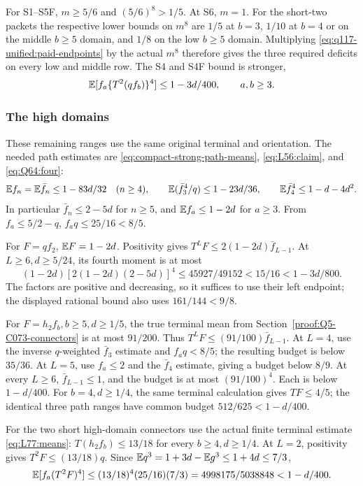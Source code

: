 For S1--S5F, \(m\ge5/6\) and \((5/6)^8>1/5\).
At S6, \(m=1\). For the short-two packets the respective
lower bounds on \(m^8\) are \(1/5\) at \(b=3\),
\(1/10\) at \(b=4\) or on the middle \(b\ge5\) domain,
and \(1/8\) on the low \(b\ge5\) domain.
Multiplying \eqref{eq:q117-unified:paid-endpoints} by the actual
\(m^8\) therefore gives the three required deficits on every
low and middle row. The S4 and S4F bound is stronger,
\begin{equation}\label{eq:q117-unified:shortone-two-step-strong}
 \mathbb E[f_a\{T^2(qf_b)\}^4]\le1-3d/400,
 \qquad a,b\ge3.
\end{equation}

\subsubsection{The high domains}
\label{sec:q117-unified:high-domains}

These remaining ranges use the same original terminal and
orientation. The needed path estimates are
\eqref{eq:compact-strong-path-means},
\eqref{eq:L56:claim}, and \eqref{eq:Q64:four}:
\[
 \mathbb E f_n=\mathbb E\bar f_n\le1-83d/32\quad(n\ge4),\qquad
 \mathbb E(\bar f_3^4/q)\le1-23d/36,\qquad
 \mathbb E\bar f_4^4\le1-d-4d^2.
\]
In particular \(\bar f_n\le2-5d\) for \(n\ge5\), and
\(\mathbb E f_a\le1-2d\) for \(a\ge3\).
From \(f_a\le5/2-q\),
\(f_aq\le25/16<8/5\).

For \(F=qf_2\), \(\mathbb E F=1-2d\). Positivity gives
\(T^LF\le2(1-2d)\bar f_{L-1}\).
At \(L\ge6,d\ge5/24\), its fourth moment is at most
\[
 (1-2d)[2(1-2d)(2-5d)]^4
 \le45927/49152<15/16<1-3d/800.
\]
The factors are positive and decreasing, so it suffices to use
their left endpoint; the displayed rational bound also uses
\(161/144<9/8\).

For \(F=h_2f_b,b\ge5,d\ge1/5\), the true terminal mean
from Section~\ref{proof:Q5-C073-connectors} is at most \(91/200\).
Thus \(T^LF\le(91/100)\bar f_{L-1}\).
At \(L=4\), use the inverse \(q\)-weighted \(\bar f_3\)
estimate and \(f_aq<8/5\); the resulting budget is below
\(35/36\). At \(L=5\), use \(f_a\le2\) and the
\(\bar f_4\) estimate, giving a budget below \(8/9\).
At every \(L\ge6\), \(\bar f_{L-1}\le1\), and the budget
is at most \((91/100)^4\). Each is below \(1-d/400\).
For \(b=4,d\ge1/4\), the same terminal calculation gives
\(TF\le4/5\); the identical three path ranges have common
budget \(512/625<1-d/400\).

For the two short high-domain connectors use the actual finite
terminal estimate \eqref{eq:L77:means}:
\(T(h_2f_b)\le13/18\) for every \(b\ge4,d\ge1/4\).
At \(L=2\), positivity gives \(T^2F\le(13/18)q\).
Since \(\mathbb E q^3=1+3d-\mathbb E g^3\le1+4d\le7/3\),
\begin{equation}\label{eq:q117-unified:high-two-step}
 \mathbb E[f_a(T^2F)^4]
 \le(13/18)^4(25/16)(7/3)
 =4998175/5038848<1-d/400.
\end{equation}

